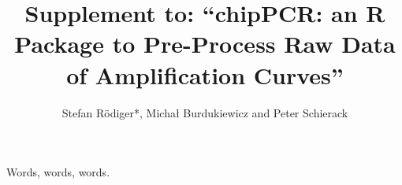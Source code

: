 \documentclass[a4paper]{article}\usepackage[]{graphicx}\usepackage[]{color}
\title{Supplement to: ``chipPCR: an R Package to Pre-Process Raw Data of Amplification Curves''}
\author{Stefan R\"{o}diger*, Micha\l{} Burdukiewicz and Peter Schierack}
\date{}
\begin{document}
\maketitle


Words, words, words.
\end{document}
